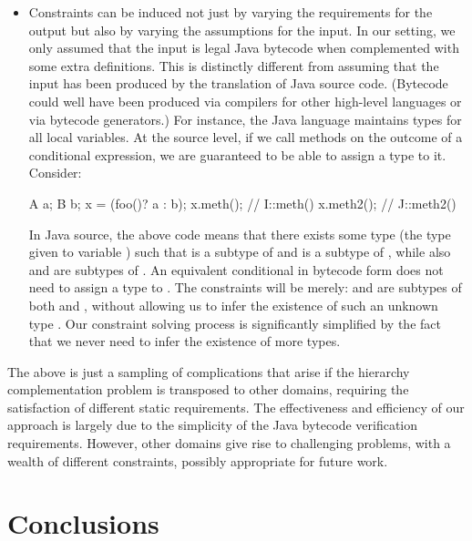 \begin{itemize}[--]
\item Constraints can be induced not just by varying the requirements
  for the output but also by varying the assumptions for the input.
  In our setting, we only assumed that the input is legal Java
  bytecode when complemented with some extra definitions. This is
  distinctly different from assuming that the input has been produced
  by the translation of Java source code. (Bytecode could well have
  been produced via compilers for other high-level languages or via
  bytecode generators.) For instance, the Java language maintains
  types for all local variables. At the source level, if we call
  methods on the outcome of a conditional expression, we are
  guaranteed to be able to assign a type to it. Consider:

  \begin{javacode}
    A a;
    B b;
    x = (foo()? a : b);
    x.meth();  // I::meth()
    x.meth2(); // J::meth2()
  \end{javacode}

  In Java source, the above code means that there exists some type
   (the type given to variable ) such that  is
  a subtype of  and  is a subtype of , while
  also  and  are subtypes of . An equivalent
  conditional in bytecode form does not need to assign a type to
  . The constraints will be merely:  and  are
  subtypes of both  and , without allowing us to infer
  the existence of such an unknown type . Our constraint
  solving process is significantly simplified by the fact that we
  never need to infer the existence of more types.

\end{itemize}

The above is just a sampling of complications that arise if the
hierarchy complementation problem is transposed to other domains,
requiring the satisfaction of different static requirements. The
effectiveness and efficiency of our approach is largely due to
the simplicity of the Java bytecode verification requirements.
However, other domains give rise to challenging problems,
with a wealth of different constraints, possibly appropriate for
future work.


\section{Conclusions}

